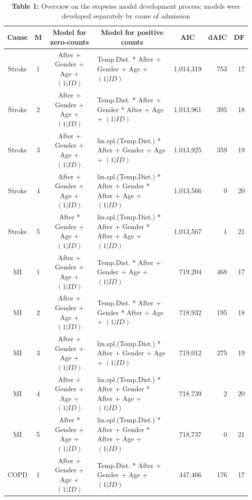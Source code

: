 \begin{landscape}


\begin{table}[htbp]
  \centering
  \small
  \caption*{\textbf{Table 1:}	 Overview on the stepwise model development process; 
  								 models were developed separately by cause of admission}
    \begin{tabular}{ccclrrr}
    \toprule
    \textbf{Cause} & \textbf{M} & \textbf{Model for zero-counts} & \multicolumn{1}{c}{\textbf{Model for positive counts}} & \multicolumn{1}{c}{\textbf{AIC}} & \multicolumn{1}{c}{\textbf{dAIC}} & \multicolumn{1}{c}{\textbf{DF}} \\
    \midrule
    Stroke & 1     & After + Gender + Age + $(1|ID)$ & Temp.Dist. * After + Gender + Age + $(1|ID)$ & 1,014,319 & 753   & 17 \\
    Stroke & 2     & After + Gender + Age + $(1|ID)$ & Temp.Dist. * After + Gender * After + Age + $(1|ID)$ & 1,013,961 & 395   & 18 \\
    Stroke & 3     & After + Gender + Age + $(1|ID)$ & lin.spl.(Temp.Dist.) * After + Gender + Age + $(1|ID)$ & 1,013,925 & 359   & 19 \\
    Stroke & 4     & After + Gender + Age + $(1|ID)$ & lin.spl.(Temp.Dist.) * After + Gender * After + Age + $(1|ID)$ & 1,013,566 & 0     & 20 \\
    Stroke & 5     & After * Gender + Age + $(1|ID)$ & lin.spl.(Temp.Dist.) * After + Gender * After + Age + $(1|ID)$ & 1,013,567 & 1     & 21 \\
    MI    & 1     & After + Gender + Age + $(1|ID)$ & Temp.Dist. * After + Gender + Age + $(1|ID)$ & 719,204 & 468   & 17 \\
    MI    & 2     & After + Gender + Age + $(1|ID)$ & Temp.Dist. * After + Gender * After + Age + $(1|ID)$ & 718,932 & 195   & 18 \\
    MI    & 3     & After + Gender + Age + $(1|ID)$ & lin.spl.(Temp.Dist.) * After + Gender + Age + $(1|ID)$ & 719,012 & 275   & 19 \\
    MI    & 4     & After + Gender + Age + $(1|ID)$ & lin.spl.(Temp.Dist.) * After + Gender * After + Age + $(1|ID)$ & 718,739 & 2     & 20 \\
    MI    & 5     & After * Gender + Age + $(1|ID)$ & lin.spl.(Temp.Dist.) * After + Gender * After + Age + $(1|ID)$ & 718,737 & 0     & 21 \\
    COPD  & 1     & After + Gender + Age + $(1|ID)$ & Temp.Dist. * After + Gender + Age + $(1|ID)$ & 447,466 & 176   & 17 \\

\end{tabular}
\end{table}
\end{landscape}
